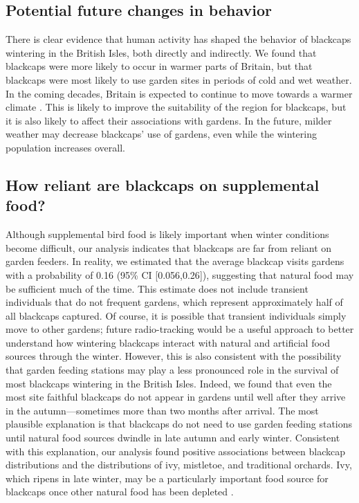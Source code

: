 \documentclass[a4paper, nobind]{templates/ociamthesis}
\begin{document}
\hypertarget{potential-future-changes-in-behavior}{%
\subsection{Potential future changes in behavior}\label{potential-future-changes-in-behavior}}

There is clear evidence that human activity has shaped the behavior of blackcaps wintering in the British Isles, both directly and indirectly. We found that blackcaps were more likely to occur in warmer parts of Britain, but that blackcaps were most likely to use garden sites in periods of cold and wet weather. In the coming decades, Britain is expected to continue to move towards a warmer climate \autocite{loweUKCP18ScienceOverview2018}. This is likely to improve the suitability of the region for blackcaps, but it is also likely to affect their associations with gardens. In the future, milder weather may decrease blackcaps' use of gardens, even while the wintering population increases overall.

\hypertarget{how-reliant-are-blackcaps-on-supplemental-food}{%
\subsection{How reliant are blackcaps on supplemental food?}\label{how-reliant-are-blackcaps-on-supplemental-food}}

Although supplemental bird food is likely important when winter conditions become difficult, our analysis indicates that blackcaps are far from reliant on garden feeders. In reality, we estimated that the average blackcap visits gardens with a probability of 0.16 (95\% CI {[}0.056,0.26{]}), suggesting that natural food may be sufficient much of the time. This estimate does not include transient individuals that do not frequent gardens, which represent approximately half of all blackcaps captured. Of course, it is possible that transient individuals simply move to other gardens; future radio-tracking would be a useful approach to better understand how wintering blackcaps interact with natural and artificial food sources through the winter. However, this is also consistent with the possibility that garden feeding stations may play a less pronounced role in the survival of most blackcaps wintering in the British Isles. Indeed, we found that even the most site faithful blackcaps do not appear in gardens until well after they arrive in the autumn---sometimes more than two months after arrival. The most plausible explanation is that blackcaps do not need to use garden feeding stations until natural food sources dwindle in late autumn and early winter. Consistent with this explanation, our analysis found positive associations between blackcap distributions and the distributions of ivy, mistletoe, and traditional orchards. Ivy, which ripens in late winter, may be a particularly important food source for blackcaps once other natural food has been depleted \autocite{snowBirdsBerries2010}.
\end{document}
